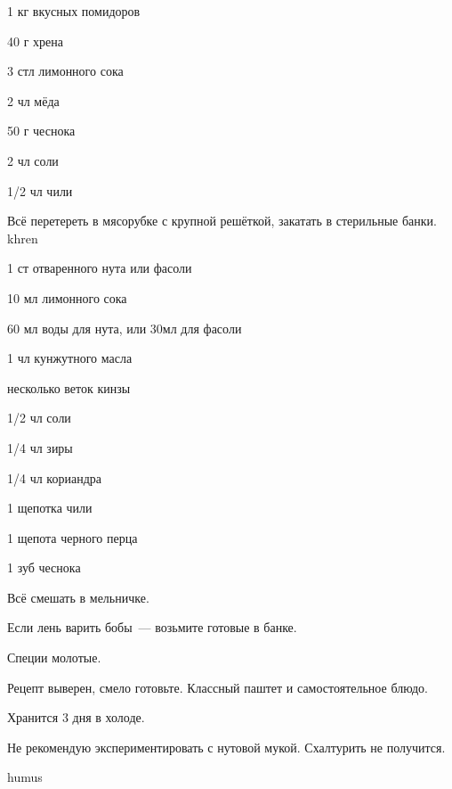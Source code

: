{
\item 1 кг вкусных помидоров
\item 40 г хрена
\item 3 стл лимонного сока
\item 2 чл мёда
}{
\item 50 г чеснока
\item 2 чл соли
\item 1/2 чл чили 
}{
Всё перетереть в мясорубке с крупной решёткой, закатать в стерильные банки.
}{}{khren}



{
\item 1 ст отваренного нута или фасоли
\item 10 мл лимонного сока
\item 60 мл воды для нута, или 30мл для фасоли
\item 1 чл кунжутного масла
\item несколько веток кинзы 
}{
\item 1/2 чл соли
\item 1/4 чл зиры
\item 1/4 чл кориандра
\item 1 щепотка чили
\item 1 щепота черного перца
\item 1 зуб чеснока
}{
Всё смешать в мельничке.
}{
\begin{advice}
\item Если лень варить бобы~--- возьмите готовые в банке. 
\item Специи молотые. 
\item Рецепт выверен, смело готовьте. Классный паштет и самостоятельное блюдо.
\item Хранится 3 дня в холоде.
\item Не рекомендую экспериментировать с нутовой мукой. Схалтурить не получится.
\end{advice}}{humus}



